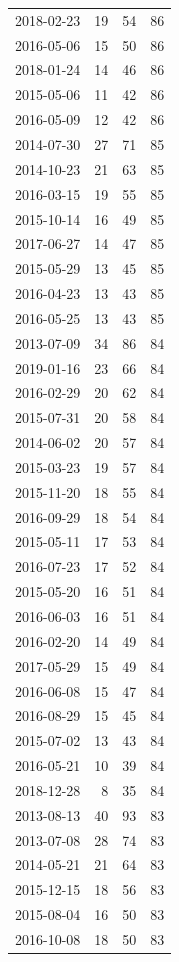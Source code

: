 \begin{tabular}{lrrr}
2018-02-23 & 19 & 54 & 86 \\
2016-05-06 & 15 & 50 & 86 \\
2018-01-24 & 14 & 46 & 86 \\
2015-05-06 & 11 & 42 & 86 \\
2016-05-09 & 12 & 42 & 86 \\
2014-07-30 & 27 & 71 & 85 \\
2014-10-23 & 21 & 63 & 85 \\
2016-03-15 & 19 & 55 & 85 \\
2015-10-14 & 16 & 49 & 85 \\
2017-06-27 & 14 & 47 & 85 \\
2015-05-29 & 13 & 45 & 85 \\
2016-04-23 & 13 & 43 & 85 \\
2016-05-25 & 13 & 43 & 85 \\
2013-07-09 & 34 & 86 & 84 \\
2019-01-16 & 23 & 66 & 84 \\
2016-02-29 & 20 & 62 & 84 \\
2015-07-31 & 20 & 58 & 84 \\
2014-06-02 & 20 & 57 & 84 \\
2015-03-23 & 19 & 57 & 84 \\
2015-11-20 & 18 & 55 & 84 \\
2016-09-29 & 18 & 54 & 84 \\
2015-05-11 & 17 & 53 & 84 \\
2016-07-23 & 17 & 52 & 84 \\
2015-05-20 & 16 & 51 & 84 \\
2016-06-03 & 16 & 51 & 84 \\
2016-02-20 & 14 & 49 & 84 \\
2017-05-29 & 15 & 49 & 84 \\
2016-06-08 & 15 & 47 & 84 \\
2016-08-29 & 15 & 45 & 84 \\
2015-07-02 & 13 & 43 & 84 \\
2016-05-21 & 10 & 39 & 84 \\
2018-12-28 & 8 & 35 & 84 \\
2013-08-13 & 40 & 93 & 83 \\
2013-07-08 & 28 & 74 & 83 \\
2014-05-21 & 21 & 64 & 83 \\
2015-12-15 & 18 & 56 & 83 \\
2015-08-04 & 16 & 50 & 83 \\
2016-10-08 & 18 & 50 & 83 \\

\end{tabular}
